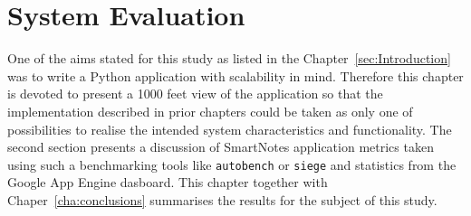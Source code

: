\chapter{System Evaluation}\label{chap:eval}
One of the aims stated for this study as listed in the Chapter~\ref{sec:Introduction} was to write a Python application with scalability in mind. Therefore this chapter is devoted to present a 1000 feet view of the application so that the implementation described in prior chapters could be taken as only one of possibilities to realise the intended system characteristics and functionality.  The second section presents a discussion of SmartNotes application metrics taken using such a benchmarking tools like \texttt{autobench} or \texttt{siege} and statistics from the Google App Engine dasboard. This chapter together with Chaper~\ref{cha:conclusions} summarises the results for the subject of this study. 

